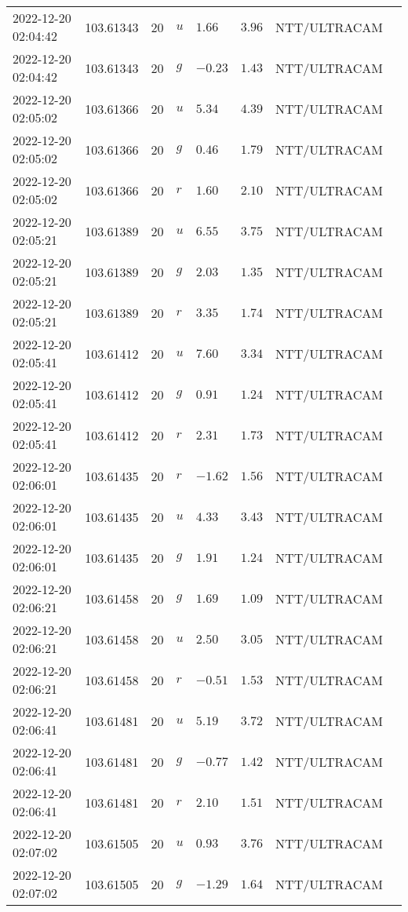 \documentclass{nature_plusfigure}
\begin{document}
\begin{supplement}
\begin{center}
\begin{longtable}{llllllll}
2022-12-20 02:04:42 & 103.61343 & 20 & $u$ & $1.66$ & $3.96$ & NTT/ULTRACAM &  \\ 
2022-12-20 02:04:42 & 103.61343 & 20 & $g$ & $-0.23$ & $1.43$ & NTT/ULTRACAM &  \\ 
2022-12-20 02:05:02 & 103.61366 & 20 & $u$ & $5.34$ & $4.39$ & NTT/ULTRACAM &  \\ 
2022-12-20 02:05:02 & 103.61366 & 20 & $g$ & $0.46$ & $1.79$ & NTT/ULTRACAM &  \\ 
2022-12-20 02:05:02 & 103.61366 & 20 & $r$ & $1.60$ & $2.10$ & NTT/ULTRACAM &  \\ 
2022-12-20 02:05:21 & 103.61389 & 20 & $u$ & $6.55$ & $3.75$ & NTT/ULTRACAM &  \\ 
2022-12-20 02:05:21 & 103.61389 & 20 & $g$ & $2.03$ & $1.35$ & NTT/ULTRACAM &  \\ 
2022-12-20 02:05:21 & 103.61389 & 20 & $r$ & $3.35$ & $1.74$ & NTT/ULTRACAM &  \\ 
2022-12-20 02:05:41 & 103.61412 & 20 & $u$ & $7.60$ & $3.34$ & NTT/ULTRACAM &  \\ 
2022-12-20 02:05:41 & 103.61412 & 20 & $g$ & $0.91$ & $1.24$ & NTT/ULTRACAM &  \\ 
2022-12-20 02:05:41 & 103.61412 & 20 & $r$ & $2.31$ & $1.73$ & NTT/ULTRACAM &  \\ 
2022-12-20 02:06:01 & 103.61435 & 20 & $r$ & $-1.62$ & $1.56$ & NTT/ULTRACAM &  \\ 
2022-12-20 02:06:01 & 103.61435 & 20 & $u$ & $4.33$ & $3.43$ & NTT/ULTRACAM &  \\ 
2022-12-20 02:06:01 & 103.61435 & 20 & $g$ & $1.91$ & $1.24$ & NTT/ULTRACAM &  \\ 
2022-12-20 02:06:21 & 103.61458 & 20 & $g$ & $1.69$ & $1.09$ & NTT/ULTRACAM &  \\ 
2022-12-20 02:06:21 & 103.61458 & 20 & $u$ & $2.50$ & $3.05$ & NTT/ULTRACAM &  \\ 
2022-12-20 02:06:21 & 103.61458 & 20 & $r$ & $-0.51$ & $1.53$ & NTT/ULTRACAM &  \\ 
2022-12-20 02:06:41 & 103.61481 & 20 & $u$ & $5.19$ & $3.72$ & NTT/ULTRACAM &  \\ 
2022-12-20 02:06:41 & 103.61481 & 20 & $g$ & $-0.77$ & $1.42$ & NTT/ULTRACAM &  \\ 
2022-12-20 02:06:41 & 103.61481 & 20 & $r$ & $2.10$ & $1.51$ & NTT/ULTRACAM &  \\ 
2022-12-20 02:07:02 & 103.61505 & 20 & $u$ & $0.93$ & $3.76$ & NTT/ULTRACAM &  \\ 
2022-12-20 02:07:02 & 103.61505 & 20 & $g$ & $-1.29$ & $1.64$ & NTT/ULTRACAM &  \\ 

\end{longtable}
\end{center}
\end{supplement}
\end{document}

